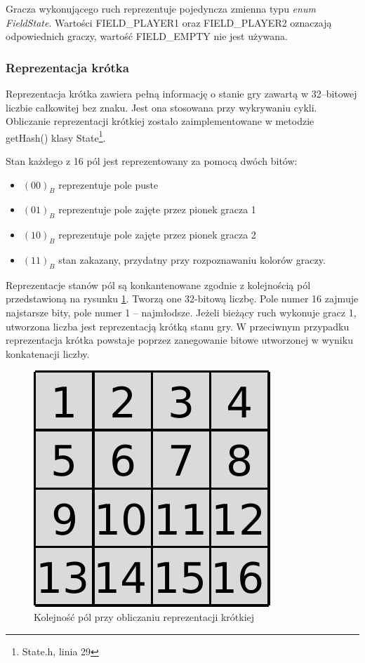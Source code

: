 \documentclass{scrartcl}
\begin{document}
Gracza wykonującego ruch reprezentuje pojedyncza zmienna typu
\emph{enum FieldState}. Wartości FIELD\_PLAYER1 oraz FIELD\_PLAYER2 
oznaczają odpowiednich graczy, wartość FIELD\_EMPTY nie jest
używana.

\subsubsection{Reprezentacja krótka}

Reprezentacja krótka zawiera pełną informację o stanie gry zawartą
w 32--bitowej liczbie całkowitej bez znaku. Jest ona stosowana przy
wykrywaniu cykli. Obliczanie reprezentacji krótkiej zostało
zaimplementowane w metodzie getHash() klasy State\footnote{
State.h, linia 29}.

Stan każdego z 16 pól jest reprezentowany za pomocą dwóch
bitów:
\begin{itemize}
\item $(00)_B$ reprezentuje pole puste
\item $(01)_B$ reprezentuje pole zajęte przez pionek gracza 1
\item $(10)_B$ reprezentuje pole zajęte przez pionek gracza 2
\item $(11)_B$ stan zakazany, przydatny przy rozpoznawaniu kolorów
  graczy.
\end{itemize}

Reprezentacje stanów pól są konkantenowane zgodnie z kolejnością pól
przedstawioną na rysunku \ref{fig:field_order}. Tworzą one 32-bitową
liczbę. Pole numer 16 zajmuje najstarsze bity, pole numer 1 --
najmłodsze. Jeżeli bieżący ruch wykonuje gracz 1,
utworzona liczba jest reprezentacją krótką stanu gry. W przeciwnym
przypadku reprezentacja krótka powstaje 
poprzez zanegowanie bitowe utworzonej w wyniku konkatenacji liczby.

\begin{figure}[h]
  \centering
  \includegraphics{data/field_order.pdf}
  \caption{Kolejność pól przy obliczaniu reprezentacji krótkiej}
  \label{fig:field_order}
\end{figure}
\end{document}
